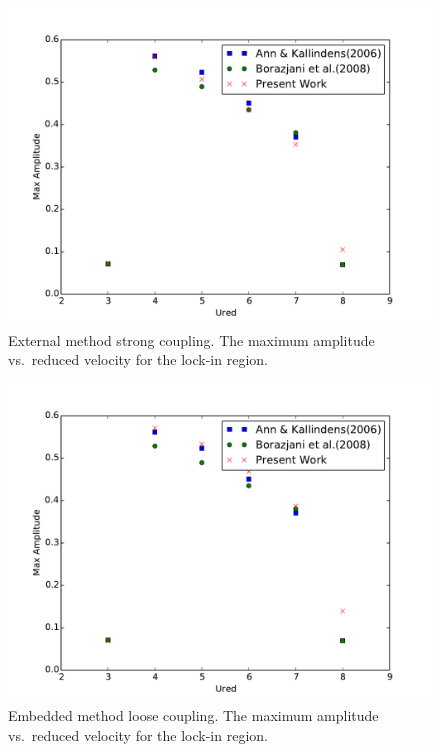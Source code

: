 \begin{figure}
	\centering
	\includegraphics[width=\textwidth]{vivexsc}
	\caption{External method strong coupling. The maximum amplitude vs.~reduced velocity for the lock-in region.}
	\label{fig:viv2}
\end{figure}
\begin{figure}
	\centering
	\includegraphics[width=\textwidth]{vivemlc}
	\caption{Embedded method loose coupling. The maximum amplitude vs.~reduced velocity for the lock-in region.}
	\label{fig:viv3}
\end{figure}
